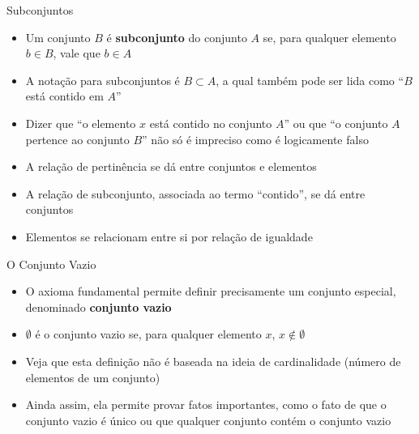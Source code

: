 \begin{frame}[fragile]{Subconjuntos}

    \begin{itemize}
        \item Um conjunto $B$ é \textbf{subconjunto} do conjunto $A$ se, para qualquer elemento $b\in B$, vale que $b\in A$

        \item A notação para subconjuntos é $B\subset A$, a qual também pode ser lida como ``$B$ está contido em $A$''

        \item Dizer que ``o elemento $x$ está contido no conjunto $A$'' ou que ``o conjunto $A$ pertence ao conjunto $B$'' não só é impreciso como é logicamente falso

        \item A relação de pertinência se dá entre conjuntos e elementos

        \item A relação de subconjunto, associada ao termo ``contido'', se dá entre conjuntos

        \item Elementos se relacionam entre si por relação de igualdade
    \end{itemize}

\end{frame}

\begin{frame}[fragile]{O Conjunto Vazio}

    \begin{itemize}
        \item O axioma fundamental permite definir precisamente um conjunto especial, denominado \textbf{conjunto vazio}

        \item $\emptyset$ é o conjunto vazio se, para qualquer elemento $x$, $x\not\in \emptyset$

        \item Veja que esta definição não é baseada na ideia de cardinalidade (número de elementos de um conjunto)

        \item Ainda assim, ela permite provar fatos importantes, como o fato de que o conjunto vazio é único ou que qualquer conjunto contém o conjunto vazio
    \end{itemize}

\end{frame}

